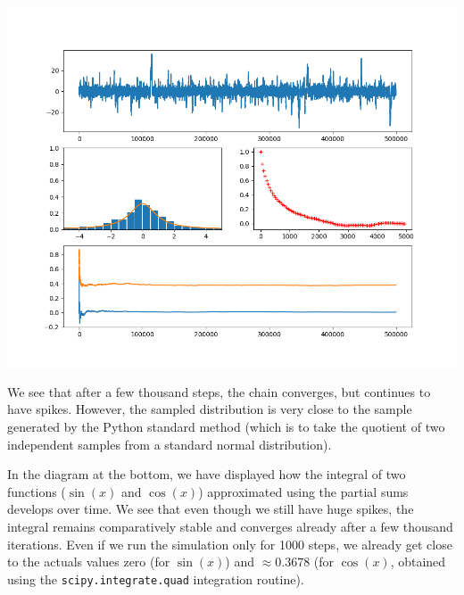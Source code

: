\documentclass[a4paper, draft]{article}
\theoremstyle{own}
\theoremstyle{remark}
\begin{document}
\includegraphics[scale=.45]{MetropolisCauchySample.png}

We see that after a few thousand steps, the chain converges, but continues to have spikes. However, the sampled distribution is very close to the sample generated by the Python standard method (which is to take the quotient of two
independent samples from a standard normal distribution). 

In the diagram at the bottom, we have displayed how the integral of two functions ($\sin(x)$ and $\cos(x)$) approximated using the partial sums develops over time. We see that even though we still have huge spikes, the integral remains comparatively stable and converges already after a few thousand iterations. Even if we run the simulation only for 1000 steps, we already get close to the actuals values zero (for $\sin(x)$) and $\approx 0.3678$ (for 
$\cos(x)$, obtained using the \verb+scipy.integrate.quad+ integration routine).
\end{document}
